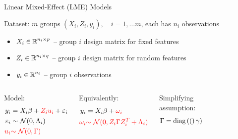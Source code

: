 \documentclass[8pt]{beamer}
\begin{document}
\begin{frame}{Linear Mixed-Effect (LME) Models}

	Dataset: $m$ groups $(X_i, Z_i, y_i),\quad i = 1, \dots m$, each has $n_i$ observations
	\begin{itemize}
		\item 	$X_i \in \operatorname{\mathbb{R}}^{n_i \times p}$ -- group $i$ design matrix for fixed features
		\item 	$Z_i \in \operatorname{\mathbb{R}}^{n_i \times q}$ -- group $i$ design matrix for random features
		\item 	$y_i \in \operatorname{\mathbb{R}}^{n_i}$ -- group $i$ observations  
	\end{itemize}
	

	\begin{columns}[T,onlytextwidth]
	
    \vspace{3em}
    Model:
	 	\[
   		\begin{split}
   			y_i & = X_i\beta + {\color{red}Z_i u_i} + \varepsilon_i \\
   			 \varepsilon_i & \sim \operatorname{\mathcal{N}}(0, \Lambda_i) \\
   			{\color{red} u_i} & {\color{red}\sim \operatorname{\mathcal{N}}(0, \Gamma)}
   		\end{split}
   		\]
   		
   	Equivalently:
   		\[
   		\begin{split}
   			y_i & = X_i\beta + \textcolor{red}{\omega_i} \\
   			{\color{red} \omega_i} & {\color{red}\sim \operatorname{\mathcal{N}}(0, Z_i\Gamma Z_i^T + \Lambda_i)}
   		\end{split}
   		\]
   	
   	Simplifying assumption: 
   	\[
   		\Gamma = \mathrm{diag}\left((\right)\gamma)
   	\]
   	
    	\centering  
   	\begin{figure}
   		\includegraphics[width=0.9\textwidth]{Figures/lme_example_random_prediction}
   	\end{figure}
   	   		


\end{columns}
\end{frame}
\end{document}
